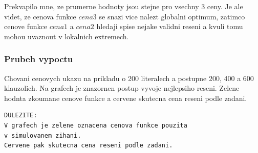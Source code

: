 \documentclass[12pt,a4paper]{article}
\begin{document}
Prekvapilo mne, ze prumerne hodnoty jsou stejne pro vsechny 3 ceny. Je ale videt, ze cenova funkce $cena3$ se snazi vice nalezt globalni optimum, zatimco cenove funkce $cena1$ a $cena2$ hledaji spise nejake validni reseni a kvuli tomu mohou uvaznout v lokalnich extremech.


\subsubsection{Prubeh vypoctu}

Chovani cenovych ukazu na prikladu o 200 literalech a postupne 200, 400 a 600 klauzolich. Na grafech je znazornen postup vyvoje nejlepsiho reseni. Zelene hodnta zkoumane cenove funkce a cervene skutecna cena reseni podle zadani.


\begin{lstlisting}[frame=single]
DULEZITE:
V grafech je zelene oznacena cenova funkce pouzita
v simulovanem zihani.
Cervene pak skutecna cena reseni podle zadani.
\end{lstlisting}	
\end{document}
